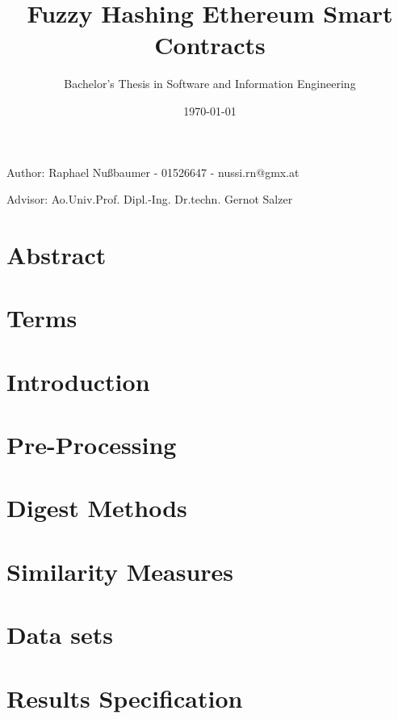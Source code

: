 \documentclass[]{article}
\title{Fuzzy Hashing Ethereum Smart Contracts}
\author{Bachelor's Thesis in Software and Information Engineering}
\date{\today}
\begin{document}
\maketitle
\begin{center}
  Author: Raphael Nußbaumer - 01526647 - nussi.rn@gmx.at

  Advisor: Ao.Univ.Prof. Dipl.-Ing. Dr.techn. Gernot Salzer
\end{center}

\section{Abstract}



\section{Terms}


\section{Introduction}


\section{Pre-Processing}


\section{Digest Methods}


\section{Similarity Measures}


\section{Data sets}


\section{Results Specification}

\end{document}

